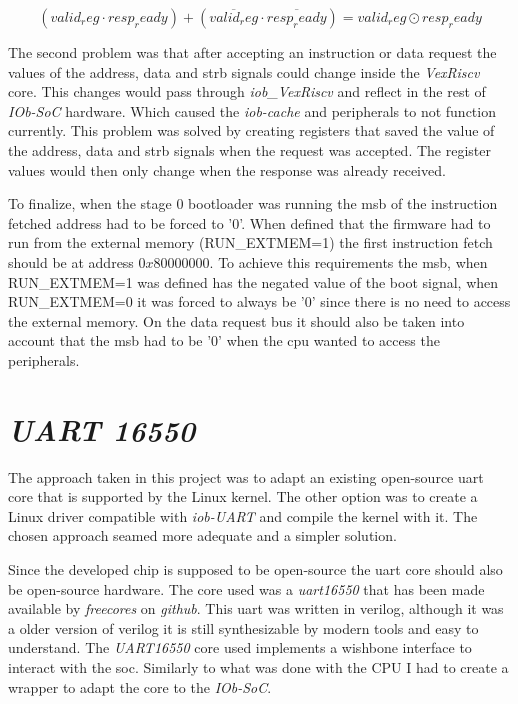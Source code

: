 \begin{equation}
  (valid_reg \cdot resp_ready) + (\overline{valid_reg} \cdot \overline{resp_ready}) = valid_reg \odot resp_ready
  \label{eq:simple_logic_eq}
\end{equation}

The second problem was that after accepting an instruction or data request the values of the address, data and strb signals could change inside the \textit{VexRiscv} core. This changes would pass through \textit{iob\_VexRiscv} and reflect in the rest of \textit{IOb-SoC} hardware. Which caused the \textit{iob-cache} and peripherals to not function currently. This problem was solved by creating registers that saved the value of the address, data and strb signals when the request was accepted. The register values would then only change when the response was already received. 

To finalize, when the stage 0 bootloader was running the \acrfull{msb} of the instruction fetched address had to be forced to '0'. When defined that the firmware had to run from the external memory (RUN\_EXTMEM=1) the first instruction fetch should be at address $0x80000000$. To achieve this requirements the \acrfull{msb}, when RUN\_EXTMEM=1 was defined has the negated value of the boot signal, when RUN\_EXTMEM=0 it was forced to always be '0' since there is no need to access the external memory. On the data request bus it should also be taken into account that the \acrshort{msb} had to be '0' when the \acrshort{cpu} wanted to access the peripherals.

\section{\textit{UART 16550}}
The approach taken in this project was to adapt an existing open-source \acrfull{uart} core that is supported by the Linux kernel. The other option was to create a Linux driver compatible with \textit{iob-UART} and compile the kernel with it. The chosen approach seamed more adequate and a simpler solution.

Since the developed chip is supposed to be open-source the \acrshort{uart} core should also be open-source hardware. The core used was a \textit{\acrshort{uart}16550}\cite{gorban2002uart} that has been made available by \textit{freecores} on \textit{github}. This \acrshort{uart} was written in verilog, although it was a older version of verilog it is still synthesizable by modern tools and easy to understand. The \textit{UART16550} core used implements a wishbone interface to interact with the \acrfull{soc}. Similarly to what was done with the CPU I had to create a wrapper to adapt the core to the \textit{IOb-SoC}.

